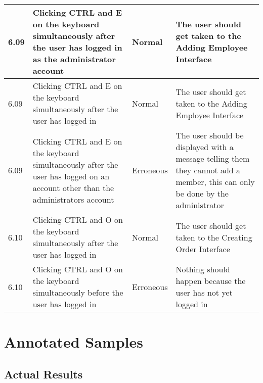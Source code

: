 \begin{flushleft}
\begin{longtable}{|p{1.5cm}|p{2.5cm}|p{2cm}|p{4.5cm}|}
	\rowcolor{light-grey} 6.09 & Clicking CTRL and E on the keyboard simultaneously after the user has logged in as the administrator account & Normal & The user should get taken to the Adding Employee Interface \\ \hline
	\rowcolor{light-grey} 6.09 & Clicking CTRL and E on the keyboard simultaneously after the user has logged in & Normal & The user should get taken to the Adding Employee Interface \\ \hline
	\rowcolor{light-grey} 6.09 & Clicking CTRL and E on the keyboard simultaneously after the user has logged on an account other than the administrators account & Erroneous & The user should be displayed with a message telling them they cannot add a member, this can only be done by the administrator \\ \hline
	\rowcolor{light-grey} 6.10 & Clicking CTRL and O on the keyboard simultaneously after the user has logged in & Normal & The user should get taken to the Creating Order Interface \\ \hline
	\rowcolor{light-grey} 6.10 & Clicking CTRL and O on the keyboard simultaneously before the user has logged in & Erroneous & Nothing should happen because the user has not yet logged in \\ \hline
    \end{longtable}
\end{flushleft}

\pagebreak

\section{Annotated Samples}

\subsection{Actual Results}

